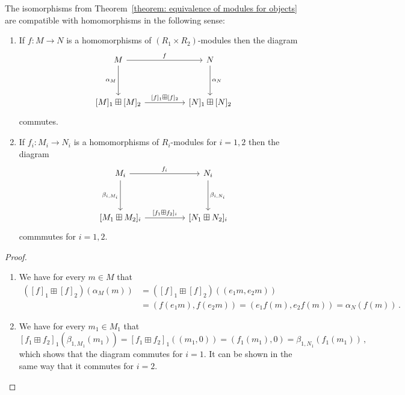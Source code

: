 \begin{theorem}
  \label{theorem: equivalence of modules for morphisms}
  The isomorphisms from Theorem~\ref{theorem: equivalence of modules for objects} are compatible with homomorphisms in the following sense:
  \begin{enumerate}
    \item
      \label{enumerate: alpha is natural}
      If $f \colon M \to N$ is a homomorphisms of $(R_1 \times R_2)$-modules then the diagram
      \[
        \begin{tikzcd}[sep = huge]
            M
            \arrow{r}[above]{f}
            \arrow{d}[left]{\alpha_M}
          & N
            \arrow{d}[right]{\alpha_N}
          \\
            {[M]_1} \boxplus {[M]_2}
            \arrow{r}[above]{{[f]_1} \boxplus {[f]_2}}
          & {[N]_1} \boxplus {[N]_2}
        \end{tikzcd}
      \]
      commutes.
    \item
      \label{enumerate: beta is natural}
      If $f_i \colon M_i \to N_i$ is a homomorphisms of $R_i$-modules for $i = 1, 2$ then the diagram
      \[
        \begin{tikzcd}[sep = huge]
            M_i
            \arrow{r}[above]{f_i}
            \arrow{d}[left]{\beta_{i, M_i}}
          & N_i
            \arrow{d}[right]{\beta_{i, N_i}}
          \\
            {[M_1 \boxplus M_2]_i}
            \arrow{r}[above]{{[f_1 \boxplus f_2]_i}}
          & {[N_1 \boxplus N_2]_i}
        \end{tikzcd}
      \]
      commmutes for $i = 1, 2$.
  \end{enumerate}
\end{theorem}


\begin{proof}
  \leavevmode
  \begin{enumerate}
    \item
      We have for every $m \in M$ that
      \begin{align*}
            ([f]_1 \boxplus [f]_2)( \alpha_M(m) )
        &=  ([f]_1 \boxplus [f]_2)( (e_1 m, e_2 m) )  \\
        &=  ( f(e_1 m), f(e_2 m) )
         =  ( e_1 f(m), e_2 f(m) )
         =  \alpha_N( f(m) ) \,.
      \end{align*}
    \item
      We have for every $m_1 \in M_1$ that
      \[
          [f_1 \boxplus f_2]_1( \beta_{1, M_1}( m_1 ) )
        = [f_1 \boxplus f_2]_1( (m_1, 0) )
        = ( f_1(m_1), 0 )
        = \beta_{1, N_1}( f_1(m_1) ) \,,
      \]
      which shows that the diagram commutes for $i = 1$.
      It can be shown in the same way that it commutes for $i = 2$.
    \qedhere
  \end{enumerate}
\end{proof}


